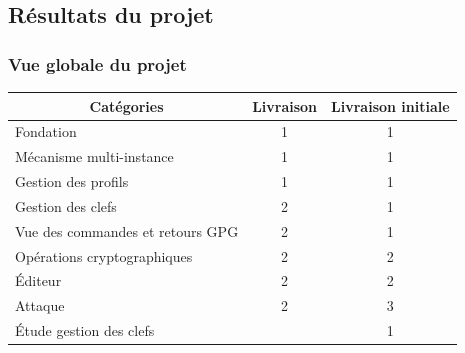   \subsection{Résultats du projet}
  \begin{frame}
    \frametitle{\color{white}Vue globale du projet}
  \begin{tabular}{|l|l|l|}
    \hline
    \multicolumn{1}{|c|}{\cellcolor{gray} \color{white}Catégories} & \multicolumn{1}{|c|}{\cellcolor{gray} \color{white}Livraison} & \multicolumn{1}{|c|}{\cellcolor{gray} \color{white}Livraison initiale} \\
    \hline
    \cellcolor{white}\color{green}Fondation & \multicolumn{1}{|c|}{\cellcolor{white}\color{black}1} & \multicolumn{1}{|c|}{\cellcolor{white}\color{black}1} \\
    \hline
    \cellcolor{white}\color{green}Mécanisme multi-instance & \multicolumn{1}{|c|}{\cellcolor{white}\color{black}1} & \multicolumn{1}{|c|}{\cellcolor{white}\color{black}1} \\    
    \hline
    \cellcolor{white}\color{green}Gestion des profils & \multicolumn{1}{|c|}{\cellcolor{white}\color{black}1} & \multicolumn{1}{|c|}{\cellcolor{white}\color{black}1} \\
    \hline
    \cellcolor{white}\color{blue}Gestion des clefs & \multicolumn{1}{|c|}{\cellcolor{white}\color{black}2} & \multicolumn{1}{|c|}{\cellcolor{white}\color{black}1} \\
    \hline
    \cellcolor{white}\color{green}Vue des commandes et retours GPG & \multicolumn{1}{|c|}{\cellcolor{white}\color{black}2} & \multicolumn{1}{|c|}{\cellcolor{white}\color{black}1} \\
    \hline
    \cellcolor{white}\color{blue}Opérations cryptographiques & \multicolumn{1}{|c|}{\cellcolor{white}\color{black}2} & \multicolumn{1}{|c|}{\cellcolor{white}\color{black}2} \\
    \hline
    \cellcolor{white}\color{blue}\'{E}diteur & \multicolumn{1}{|c|}{\cellcolor{white}\color{black}2} & \multicolumn{1}{|c|}{\cellcolor{white}\color{black}2} \\
    \hline
    \cellcolor{white}\color{red}Attaque & \multicolumn{1}{|c|}{\cellcolor{white}\color{black}2} & \multicolumn{1}{|c|}{\cellcolor{white}\color{black}3} \\
    \hline
    \cellcolor{white}\color{red}\'{E}tude gestion des clefs & \multicolumn{1}{|c|}{\cellcolor{white}\color{black}} & \multicolumn{1}{|c|}{\cellcolor{white}\color{black}1} \\

\end{tabular}
\end{frame}
